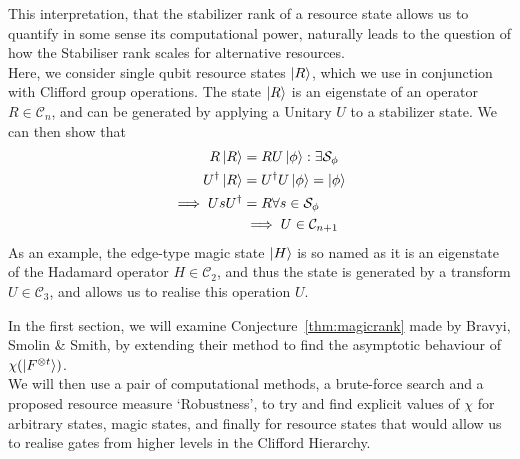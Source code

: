 \documentclass{standalone}
\begin{document}
This interpretation, that the stabilizer rank of a resource state allows us to quantify in some sense its computational power, naturally leads to the question of how the Stabiliser rank scales for alternative resources. \\
Here, we consider single qubit resource states $\ket{R}$, which we use in conjunction with Clifford group operations. The state $\ket{R}$ is an eigenstate of an operator $R\in\mathcal{C}_{n}$, and can be generated by applying a Unitary $U$ to a stabilizer state. We can then show that
\begin{align}\label{eq:resourcegate}
\begin{split}
R\ket{R} &= R U\ket{\phi} : \exists \mathcal{S}_{\phi} \\
U^{\dagger}\ket{R} &= U^{\dagger}U\ket{\phi} = \ket{\phi}\\
\implies UsU^{\dagger} &= R \forall s\in\mathcal{S}_{\phi}\\
&\implies U \in\mathcal{C}_{n+1} \\
\end{split}
\end{align}
As an example, the edge-type magic state $\ket{H}$ is so named as it is an eigenstate of the Hadamard operator $H\in\mathcal{C}_{2}$, and thus the state is generated by a transform $U\in\mathcal{C}_{3}$, and allows us to realise this operation $U$.
\par
In the first section, we will examine Conjecture~\ref{thm:magicrank} made by Bravyi, Smolin \& Smith, by extending their method to find the asymptotic behaviour of $\chi(\ket{F^{\otimes t}})$. \\
We will then use a pair of computational methods, a brute-force search and a proposed resource measure `Robustness', to try and find explicit values of $\chi$ for arbitrary states, magic states, and finally for resource states that would allow us to realise gates from higher levels in the Clifford Hierarchy.
\end{document}
